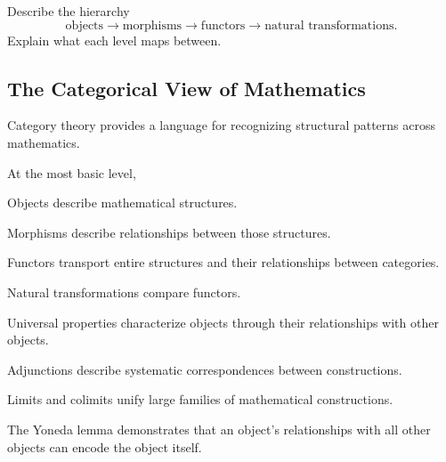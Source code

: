 \begin{exercise}[3]
Describe the hierarchy
\[
\text{objects}
\longrightarrow
\text{morphisms}
\longrightarrow
\text{functors}
\longrightarrow
\text{natural transformations}.
\]
Explain what each level maps between.
\end{exercise}

\subsection{The Categorical View of Mathematics}
\label{subsec:categorical-view-mathematics}

Category theory provides a language for recognizing structural patterns
across mathematics.

At the most basic level,

\begin{center}
\end{center}

Objects describe mathematical structures.

Morphisms describe relationships between those structures.

Functors transport entire structures and their relationships between
categories.

Natural transformations compare functors.

Universal properties characterize objects through their relationships with
other objects.

Adjunctions describe systematic correspondences between constructions.

Limits and colimits unify large families of mathematical constructions.

The Yoneda lemma demonstrates that an object's relationships with all other
objects can encode the object itself.

